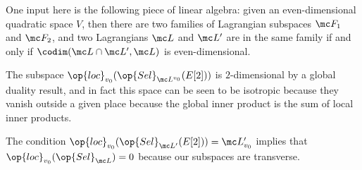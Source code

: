 \documentclass[../notes.tex]{subfiles}
\begin{document}
\begin{remark}
	One input here is the following piece of linear algebra: given an even-dimensional quad\-ratic space $V$, then there are two families of Lagrangian subspaces $\mc F_1$ and $\mc F_2$, and two Lagrangians $\mc L$ and $\mc L'$ are in the same family if and only if $\codim(\mc L\cap\mc L',\mc L)$ is even-dimensional.
\end{remark}
\begin{example}
	The subspace $\op{loc}_{v_0}(\op{Sel}_{\mc L^{v_0}}(E[2]))$ is $2$-dimensional by a global duality result, and in fact this space can be seen to be isotropic because they vanish outside a given place because the global inner product is the sum of local inner products.
\end{example}
\begin{remark}
	The condition $\op{loc}_{v_0}(\op{Sel}_{\mc L'}(E[2]))=\mc L'_{v_0}$ implies that $\op{loc}_{v_0}(\op{Sel}_{\mc L})=0$ because our subspaces are transverse.
\end{remark}
\end{document}
